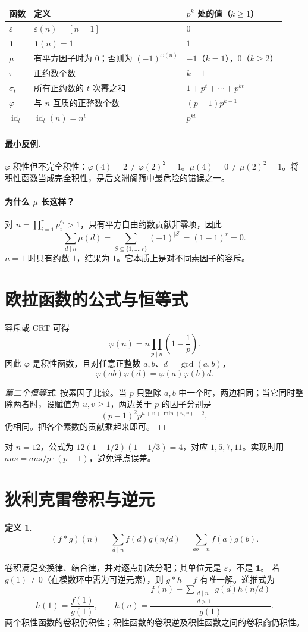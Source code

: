 \documentclass[UTF8,a4paper,11pt,oneside,openany,fontset=fandol]{ctexbook}
\theoremstyle{definition}
\newtheorem{definition}{定义}[chapter]
\newcommand{\eps}{\varepsilon}
\newcommand{\one}{\mathbf 1}
\newcommand{\id}{\operatorname{id}}
\begin{document}
\begin{longtable}{p{}p{}p{}}
\toprule
函数 & 定义 & $p^k$ 处的值（$k\ge1$）\\\midrule
$\eps$ & $\eps(n)=[n=1]$ & $0$\\
$\one$ & $\one(n)=1$ & $1$\\
$\mu$ & 有平方因子时为 $0$；否则为 $(-1)^{\omega(n)}$ & $-1$（$k=1$），$0$（$k\ge2$）\\
$\tau$ & 正约数个数 & $k+1$\\
$\sigma_t$ & 所有正约数的 $t$ 次幂之和 & $1+p^t+\cdots+p^{kt}$\\
$\varphi$ & 与 $n$ 互质的正整数个数 & $(p-1)p^{k-1}$\\
$\id_t$ & $\id_t(n)=n^t$ & $p^{kt}$\\
\bottomrule
\end{longtable}

\paragraph{最小反例.} $\varphi$ 积性但不完全积性：$\varphi(4)=2\ne\varphi(2)^2=1$。$\mu(4)=0\ne\mu(2)^2=1$。将积性函数当成完全积性，是后文洲阁筛中最危险的错误之一。
\paragraph{为什么 $\mu$ 长这样？}
对 $n=\prod_{i=1}^r p_i^{e_i}>1$，只有平方自由约数贡献非零项，因此
\[
 \sum_{d\mid n}\mu(d)=\sum_{S\subseteq\{1,\ldots,r\}}(-1)^{|S|}=(1-1)^r=0.
\]
$n=1$ 时只有约数 $1$，结果为 $1$。它本质上是对不同素因子的容斥。


\section{欧拉函数的公式与恒等式}
容斥或 CRT 可得
\[
 \varphi(n)=n\prod_{p\mid n}\left(1-\frac1p\right).
\]
因此 $\varphi$ 是积性函数，且对任意正整数 $a,b$、$d=\gcd(a,b)$，
\[
 \varphi(ab)\varphi(d)=\varphi(a)\varphi(b)d.
\]

\begin{proof}[第二个恒等式]
按素因子比较。当 $p$ 只整除 $a,b$ 中一个时，两边相同；当它同时整除两者时，设赋值为 $u,v\ge1$，两边关于 $p$ 的因子分别是
\[
 (p-1)^2p^{u+v+\min(u,v)-2},
\]
仍相同。把各个素数的贡献乘起来即可。
\end{proof}
对 $n=12$，公式为 $12(1-1/2)(1-1/3)=4$，对应 $1,5,7,11$。实现时用 $ans=ans/p\cdot(p-1)$，避免浮点误差。


\section{狄利克雷卷积与逆元}
\begin{definition}
\[
 (f*g)(n)=\sum_{d\mid n}f(d)g(n/d)=\sum_{ab=n}f(a)g(b).
\]
\end{definition}
卷积满足交换律、结合律，并对逐点加法分配；其单位元是 $\eps$，不是 $\one$。
若 $g(1)\ne0$（在模数环中需为可逆元素），则 $g*h=f$ 有唯一解。递推式为
\[
 h(1)=\frac{f(1)}{g(1)},\qquad
 h(n)=\frac{f(n)-\sum_{\substack{d\mid n\\d>1}}g(d)h(n/d)}{g(1)}.
\]
两个积性函数的卷积仍积性；积性函数的卷积逆及积性函数之间的卷积商仍积性。
\end{document}
